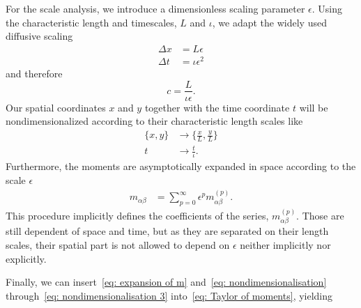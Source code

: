 For the scale analysis, we introduce a dimensionless scaling parameter $\epsilon$.
Using the characteristic length and timescales, $L$ and $\iota$, we adapt the widely used diffusive scaling
\begin{equation}
  \label{eq: nondimensionalisation}
  \begin{aligned}
    \Delta x & = L\epsilon \\
    \Delta t & = \iota\epsilon^2
  \end{aligned}
\end{equation}
and therefore
\begin{equation}
  \label{eq: nondimensionalisation 2}
  c = \frac{L}{\iota\epsilon}.
\end{equation}
Our spatial coordinates $x$ and $y$ together with the time coordinate $t$ will be nondimensionalized according to their characteristic length scales like
\begin{equation}
  \label{eq: nondimensionalisation 3}
  \begin{aligned}
    \{x, y\} & \rightarrow \{\frac{x}{L}, \frac{y}{L}\} \\
    t & \rightarrow \frac{t}{\iota}.
  \end{aligned}
\end{equation}
Furthermore, the moments are asymptotically expanded in space according to the scale $\epsilon$
\begin{align}
    \label{eq: expansion of m}
    m_{\alpha\beta} & = \sum_{p=0}^{\infty} \epsilon^p m_{\alpha\beta}^{(p)}.
\end{align}
This procedure implicitly defines the coefficients of the series, $m_{\alpha\beta}^{(p)}$.
Those are still dependent of space and time, but as they are separated on their length scales, their spatial part is not allowed to depend on $\epsilon$ neither implicitly nor explicitly.

Finally, we can insert~\eqref{eq: expansion of m} and~\eqref{eq: nondimensionalisation}
through~\eqref{eq: nondimensionalisation 3} into~\eqref{eq: Taylor of moments}, yielding

